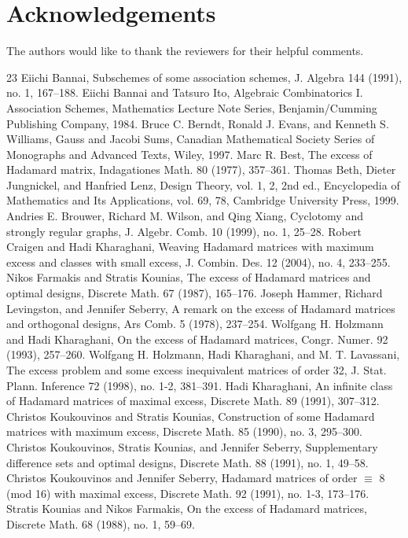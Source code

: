 \documentclass[10pt]{amsart}
\theoremstyle{definition}
\newcommand{\longthanks}[1]{\section*{Acknowledgements}#1}
\begin{document}
\longthanks{The authors would like to thank the reviewers for their helpful comments.}
\nocite{*}
\begin{thebibliography}{23}
 Eiichi Bannai, Subschemes of some association schemes, J. Algebra 144 (1991), no. 1, 167–188.
 Eiichi Bannai and Tatsuro Ito, Algebraic Combinatorics I. Association Schemes, Mathematics Lecture Note Series, Benjamin/Cumming Publishing Company, 1984.
 Bruce C. Berndt, Ronald J. Evans, and Kenneth S. Williams, Gauss and Jacobi Sums, Canadian Mathematical Society Series of Monographs and Advanced Texts, Wiley, 1997.
 Marc R. Best, The excess of Hadamard matrix, Indagationes Math. 80 (1977), 357–361.
 Thomas Beth, Dieter Jungnickel, and Hanfried Lenz, Design Theory, vol. 1, 2, 2nd ed., Encyclopedia of Mathematics and Its Applications, vol. 69, 78, Cambridge University Press, 1999.
 Andries E. Brouwer, Richard M. Wilson, and Qing Xiang, Cyclotomy and strongly regular graphs, J. Algebr. Comb. 10 (1999), no. 1, 25–28.
 Robert Craigen and Hadi Kharaghani, Weaving Hadamard matrices with maximum excess and classes with small excess, J. Combin. Des. 12 (2004), no. 4, 233–255.
 Nikos Farmakis and Stratis Kounias, The excess of Hadamard matrices and optimal designs, Discrete Math. 67 (1987), 165–176.
 Joseph Hammer, Richard Levingston, and Jennifer Seberry, A remark on the excess of Hadamard matrices and orthogonal designs, Ars Comb. 5 (1978), 237–254.
 Wolfgang H. Holzmann and Hadi Kharaghani, On the excess of Hadamard matrices, Congr. Numer. 92 (1993), 257–260.
 Wolfgang H. Holzmann, Hadi Kharaghani, and M. T. Lavassani, The excess problem and some excess inequivalent matrices of order 32, J. Stat. Plann. Inference 72 (1998), no. 1-2, 381–391.
 Hadi Kharaghani, An infinite class of Hadamard matrices of maximal excess, Discrete Math. 89 (1991), 307–312.
 Christos Koukouvinos and Stratis Kounias, Construction of some Hadamard matrices with maximum excess, Discrete Math. 85 (1990), no. 3, 295–300.
 Christos Koukouvinos, Stratis Kounias, and Jennifer Seberry, Supplementary difference sets and optimal designs, Discrete Math. 88 (1991), no. 1, 49–58.
 Christos Koukouvinos and Jennifer Seberry, Hadamard matrices of order $\equiv$ 8 (mod 16) with maximal excess, Discrete Math. 92 (1991), no. 1-3, 173–176.
 Stratis Kounias and Nikos Farmakis, On the excess of Hadamard matrices, Discrete Math. 68 (1988), no. 1, 59–69.

\end{thebibliography}
\end{document}
